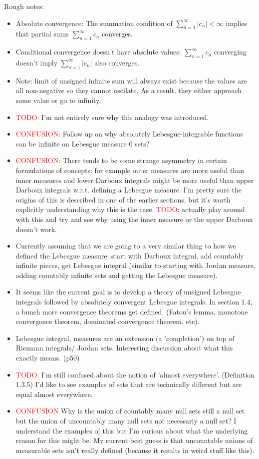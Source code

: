 \documentclass[answers,12pt]{exam}
\begin{document}
Rough notes:
\begin{itemize}[noitemsep]
    \item Absolute convergence: The summation condition of $\sum_{n=1}^{\infty}|c_n| < \infty$ implies that partial sums $\sum_{n=1}^{\infty} c_n$ converges.
    \item Conditional convergence doesn't have absolute values: $\sum_{n=1}^{\infty}c_n$ converging doesn't imply $\sum_{n=1}^{\infty}|c_n|$ also converges.
    \item Note: limit of unsigned infinite sum will always exist because the values are all non-negative so they cannot oscilate.
    As a result, they either approach some value or go to infinity.
    \item \textcolor{red}{TODO:} I'm not entirely sure why this analogy was introduced.
    \item \textcolor{red}{CONFUSION:} Follow up on why absolutely Lebesgue-integrable functions can be infinite on Lebesgue measure 0 sets?
    \item \textcolor{red}{CONFUSION:} There tends to be some strange asymmetry in certain formulations of concepts: 
    for example outer measures are more useful than inner measures and lower Darboux integrals might be more useful than upper Darboux integrals w.r.t. defining a Lebesgue measure.
    I'm pretty sure the origins of this is described in one of the earlier sections, but it's worth explicitly understanding why this is the case.
    \textcolor{red}{TODO}: actually play around with this and try and see why using the inner measure or the upper Darboux doesn't work.
    \item Currently assuming that we are going to a very similar thing to how we defined the Lebesgue measure: start with Darboux integral, add countably infinite pieces, get Lebesgue integral (similar to starting with Jordan measure, adding countably infinite sets and getting the Lebesgue measure).
    \item It seems like the current goal is to develop a theory of unsigned Lebesgue integrals followed by absolutely convergent Lebesgue integrals.
    In section 1.4, a bunch more convergence theorems get defined. 
    (Fatou's lemma, monotone convergence theorem, dominated convergence theorem, etc).
    \item Lebesgue integral, measures are an extension (a 'completion') on top of Riemann integrals/ Jordan sets.
    Interesting discussion about what this exactly means. (p50)
    \item \textcolor{red}{TODO:} I'm still confused about the notion of 'almost everywhere'. (Definition 1.3.5)
    I'd like to see examples of sets that are technically different but are equal almost everywhere.
    \item \textcolor{red}{CONFUSION} Why is the union of countably many null sets still a null set but the union of uncountably many null sets not necessariy a null set?
    I understand the examples of this but I'm curious about what the underlying reason for this might be.
    My current best guess is that uncountable unions of measurable sets isn't really defined (because it results in weird stuff like this).
\end{itemize}
\end{document}
